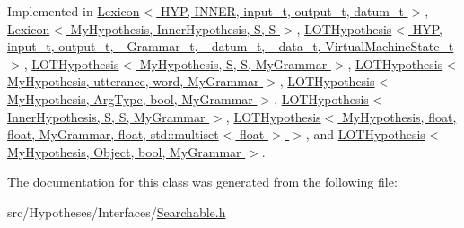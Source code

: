 Implemented in \hyperlink{class_lexicon_a6419f323377d4c524363707eee0cae09}{Lexicon$<$ H\+Y\+P, I\+N\+N\+E\+R, input\+\_\+t, output\+\_\+t, datum\+\_\+t $>$}, \hyperlink{class_lexicon_a6419f323377d4c524363707eee0cae09}{Lexicon$<$ My\+Hypothesis, Inner\+Hypothesis, S, S $>$}, \hyperlink{class_l_o_t_hypothesis_a097cde606ec3f277fdeb92145599027f}{L\+O\+T\+Hypothesis$<$ H\+Y\+P, input\+\_\+t, output\+\_\+t, \+\_\+\+Grammar\+\_\+t, \+\_\+datum\+\_\+t, \+\_\+data\+\_\+t, Virtual\+Machine\+State\+\_\+t $>$}, \hyperlink{class_l_o_t_hypothesis_a097cde606ec3f277fdeb92145599027f}{L\+O\+T\+Hypothesis$<$ My\+Hypothesis, S, S, My\+Grammar $>$}, \hyperlink{class_l_o_t_hypothesis_a097cde606ec3f277fdeb92145599027f}{L\+O\+T\+Hypothesis$<$ My\+Hypothesis, utterance, word, My\+Grammar $>$}, \hyperlink{class_l_o_t_hypothesis_a097cde606ec3f277fdeb92145599027f}{L\+O\+T\+Hypothesis$<$ My\+Hypothesis, Arg\+Type, bool, My\+Grammar $>$}, \hyperlink{class_l_o_t_hypothesis_a097cde606ec3f277fdeb92145599027f}{L\+O\+T\+Hypothesis$<$ Inner\+Hypothesis, S, S, My\+Grammar $>$}, \hyperlink{class_l_o_t_hypothesis_a097cde606ec3f277fdeb92145599027f}{L\+O\+T\+Hypothesis$<$ My\+Hypothesis, float, float, My\+Grammar, float, std\+::multiset$<$ float $>$ $>$}, and \hyperlink{class_l_o_t_hypothesis_a097cde606ec3f277fdeb92145599027f}{L\+O\+T\+Hypothesis$<$ My\+Hypothesis, Object, bool, My\+Grammar $>$}.



The documentation for this class was generated from the following file\+:\begin{DoxyCompactItemize}
\item 
src/\+Hypotheses/\+Interfaces/\hyperlink{_searchable_8h}{Searchable.\+h}\end{DoxyCompactItemize}
